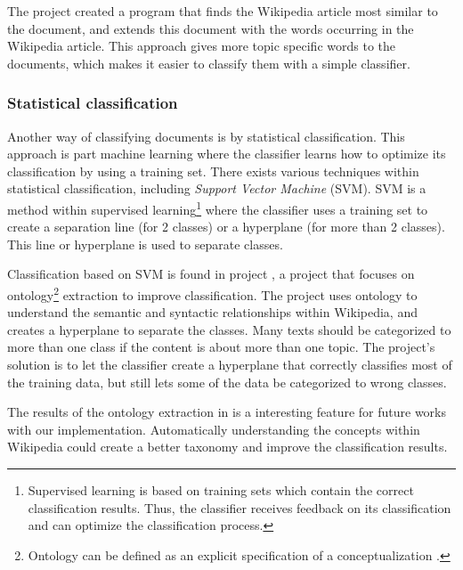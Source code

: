 The project created a program that finds the Wikipedia article most similar to the document, and extends this document with the words occurring in the Wikipedia article. This approach gives more topic specific words to the documents, which makes it easier to classify them with  a simple classifier. 

\subsubsection{Statistical classification}
Another way of classifying documents is by statistical classification. This approach is part machine learning where the classifier learns how to optimize its classification by using a training set. There exists various techniques within statistical classification, including \emph{Support Vector Machine} (SVM).  %
SVM is a method within supervised learning\footnote{Supervised learning is based on training sets which contain the correct classification results. Thus, the classifier receives feedback on its classification and can optimize the classification process.} %
where the classifier uses a training set to create a separation line (for 2 classes) or a hyperplane (for more than 2 classes). This line or hyperplane is used to separate classes. 

Classification based on SVM is found in project \cite{kozlova2005automatic}, a project that focuses on ontology\footnote{Ontology can be defined as an explicit specification of a conceptualization \cite{gruberontology}.} extraction to improve classification. The project uses ontology to understand the semantic and syntactic relationships within Wikipedia, and creates a hyperplane to separate the classes. Many texts should be categorized to more than one class if the content is about more than one topic. The project's solution is to let the classifier create a hyperplane that correctly classifies most of the training data, but still lets some of the data be categorized to wrong classes. 

The results of the ontology extraction in  \cite{kozlova2005automatic} is a interesting feature for future works with our implementation. Automatically understanding the concepts within Wikipedia could create a better taxonomy and improve the classification results. 
